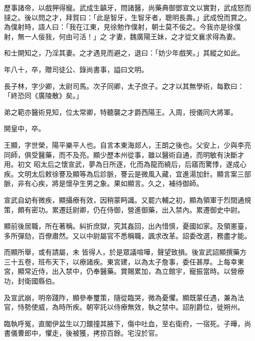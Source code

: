\begin{pinyinscope}
 歷事諸帝，以戲狎得寵。武成生齻牙，問諸醫，尚藥典御鄧宣文以實對，武成怒而撻之。後以問之才，拜賀曰：「此是智牙，生智牙者，聰明長壽。」武成悅而賞之。為僕射時，語人曰：「我在江東，見徐勉作僕射，朝士莫不佞之。今我亦是徐僕射，無一人佞我，何由可活！」之
 才妻，魏廣陽王妹，之才從文襄求得為妻。



 和士開知之，乃淫其妻。之才遇見而避之，退曰：「妨少年戲笑。」其縱之如此。



 年八十，卒，贈司徒公、錄尚書事，謚曰文明。



 長子林，字少卿，太尉司馬。次子同卿，太子庶子。之才以其無學術，每歎曰：「終恐同《廣陵散》矣。」



 弟之範亦醫術見知，位太常卿，特聽襲之才爵西陽王。入周，授儀同大將軍。



 開皇中，卒。



 王顯，字世榮，陽平樂平人也。自言本東海郯人，王朗之後也。父安上，少與李亮同師，俱受醫藥，而不及亮。顯少歷本州從事，雖以醫術自通，而明敏有決斷才用。初文
 昭太后之懷宣武，夢為日所逐，化而為龍而繞后，后寤而驚悸，遂成心疾。文明太后敕徐謇及顯等為后診脈，謇云是微風入藏，宜進湯加針。顯言案三部脈，非有心疾，將是懷孕生男之象。果如顯言。久之，補待御師。



 宣武自幼有微疾，顯攝療有效，因稍蒙眄識。又罷六輔之初，顯為領軍于烈間通規策，頗有密功。累遷廷尉卿，仍在侍御，營進御藥，出入禁內。累遷御史中尉。



 顯前後居職，所在著稱。糾折庶獄，究其姦回，出內惜慎，憂國如家。及領憲臺，多所彈劾，百僚肅然。又以中尉屬官不悉稱職，諷求改革。詔委改選，務盡才能。



 而顯所舉，或有請屬，未
 皆得人，於是眾議喧嘩，聲望致損。後宣武詔顯撰藥方三十五卷，班布天下，以療諸疾。東宮建，以為太子詹事，委任甚厚。上每幸東宮，顯常近侍，出入禁中，仍奉醫藥。賞賜累加，為立館宇，寵振當時。以營療功，封衛國縣伯。



 及宣武崩，明帝踐阼，顯參奉璽策，隨從臨哭，微為憂懼。顯既蒙任遇，兼為法官，恃勢使威，為時所疾。朝宰託以侍療無效，執之禁中。詔削爵位，徙朔州。



 臨執呼冤，直閣伊盆生以刀鐶撞其腋下，傷中吐血，至右衛府，一宿死。子曄，尚書儀曹郎中，懼走，後被獲，拷掠百餘。宅沒於官。




\end{pinyinscope}
